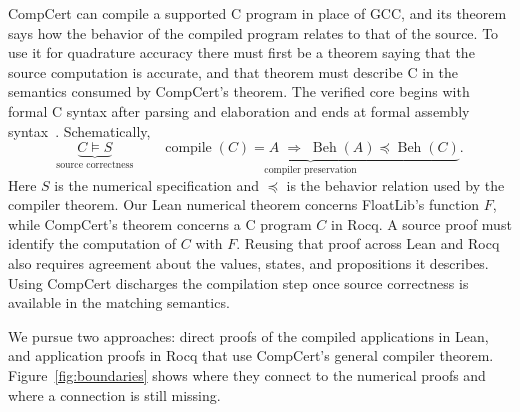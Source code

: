 \documentclass[11pt]{article}
\begin{document}
CompCert can compile a supported C program in place of GCC, and its theorem
says how the behavior of the compiled program relates to that of the
source. To use it for quadrature accuracy there must first be a theorem
saying that the source computation is accurate, and that theorem must
describe C in the semantics consumed by CompCert's theorem. The verified
core begins with formal C syntax after parsing and elaboration and ends at
formal assembly syntax~\cite{compcertmanual}. Schematically,
\[
 \underbrace{C\models S}_{\text{source correctness}}
 \qquad
 \underbrace{\operatorname{compile}(C)=A
      \;\Longrightarrow\; \operatorname{Beh}(A)
        \preceq\operatorname{Beh}(C)}_{\text{compiler preservation}} .
\]
Here $S$ is the numerical specification and $\preceq$ is the behavior
relation used by the compiler theorem. Our Lean numerical theorem concerns
FloatLib's function $F$, while CompCert's theorem concerns a C program $C$
in Rocq. A source proof must identify the computation of $C$ with $F$.
Reusing that proof across Lean and Rocq also requires agreement about the
values, states, and propositions it describes. Using CompCert discharges
the compilation step once source correctness is available in the matching
semantics.

We pursue two approaches: direct proofs of the compiled applications in
Lean, and application proofs in Rocq that use CompCert's general compiler
theorem. Figure~\ref{fig:boundaries} shows where they connect to the
numerical proofs and where a connection is still missing.
\end{document}
